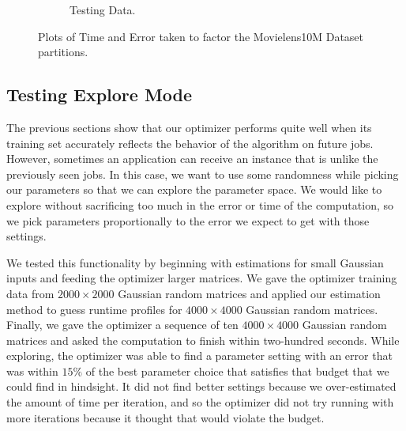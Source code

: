 \begin{figure}
\begin{subfigure}[b]{.45\textwidth}
\begin{center}
		\caption{Testing Data. }
\end{center}
	\end{subfigure}
\hfill
	\caption{Plots of Time and Error taken to factor the Movielens10M Dataset partitions.}	
\end{figure}

\subsection{Testing Explore Mode}
The previous sections show that our optimizer performs quite well when its training set accurately reflects the behavior of the algorithm on future jobs. However, sometimes an application can receive an instance that is unlike the previously seen jobs. In this case, we want to use some randomness while picking our parameters so that we can explore the parameter space. We would like to explore without sacrificing too much in the error or time of the computation, so we pick parameters proportionally to the error we expect to get with those settings. 

We tested this functionality by beginning with estimations for small Gaussian inputs and feeding the optimizer larger matrices. We gave the optimizer training data from $2000 \times 2000$ Gaussian random matrices and applied our estimation method to guess runtime profiles for $4000 \times 4000$ Gaussian random matrices. Finally, we gave the optimizer a sequence of ten $4000 \times 4000$ Gaussian random matrices and asked the computation to finish within two-hundred seconds. While exploring, the optimizer was able to find a parameter setting with an error that was within $15\%$ of the best parameter choice that satisfies that budget that we could find in hindsight. It did not find better settings because we over-estimated the amount of time per iteration, and so the optimizer did not try running with more iterations because it thought that would violate the budget.